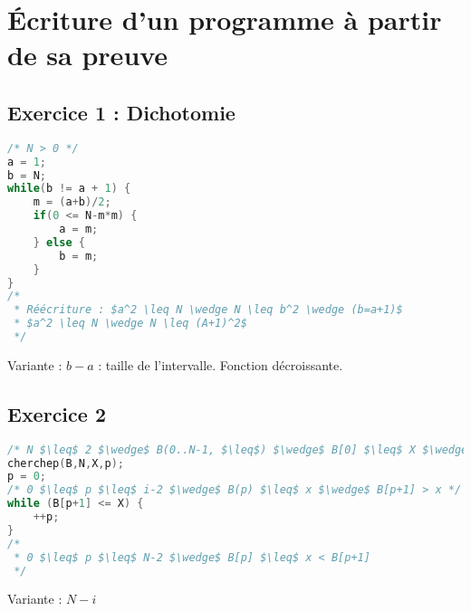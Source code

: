 \section{\'Ecriture d'un programme à partir de sa preuve}
\subsection{Exercice 1 : Dichotomie}
\begin{lstlisting}[language=C]
/* N > 0 */
a = 1;
b = N;
while(b != a + 1) {
	m = (a+b)/2;
	if(0 <= N-m*m) {
		a = m;
	} else {
		b = m;
	}
}
/*
 * Réécriture : $a^2 \leq N \wedge N \leq b^2 \wedge (b=a+1)$
 * $a^2 \leq N \wedge N \leq (A+1)^2$  
 */
\end{lstlisting}
Variante : $b-a$ : taille de l'intervalle. Fonction décroissante.
\subsection{Exercice 2}

\begin{lstlisting}[language=C]
/* N $\leq$ 2 $\wedge$ B(0..N-1, $\leq$) $\wedge$ B[0] $\leq$ X $\wedge$ B[N-1] > X */
cherchep(B,N,X,p);
p = 0; 
/* 0 $\leq$ p $\leq$ i-2 $\wedge$ B(p) $\leq$ x $\wedge$ B[p+1] > x */ 
while (B[p+1] <= X) {
	++p;
}
/* 
 * 0 $\leq$ p $\leq$ N-2 $\wedge$ B[p] $\leq$ x < B[p+1] 
 */
\end{lstlisting}
Variante : $N - i$
